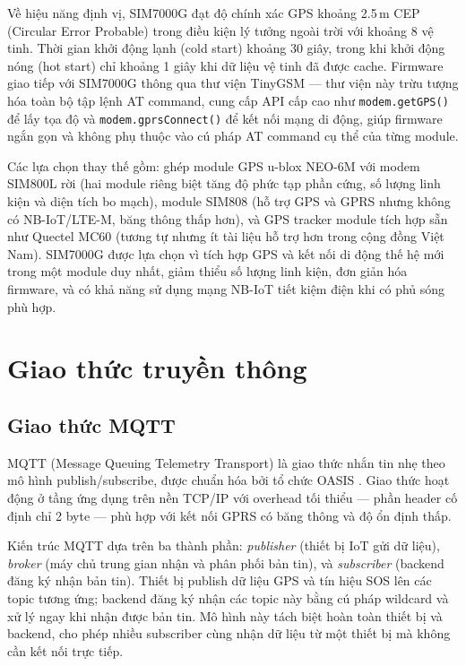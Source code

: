 \documentclass[../DoAn.tex]{subfiles}
\begin{document}
Về hiệu năng định vị, SIM7000G đạt độ chính xác GPS khoảng 2.5\,m CEP (Circular Error Probable) trong điều kiện lý tưởng ngoài trời với khoảng 8 vệ tinh. Thời gian khởi động lạnh (cold start) khoảng 30 giây, trong khi khởi động nóng (hot start) chỉ khoảng 1 giây khi dữ liệu vệ tinh đã được cache. Firmware giao tiếp với SIM7000G thông qua thư viện TinyGSM — thư viện này trừu tượng hóa toàn bộ tập lệnh AT command, cung cấp API cấp cao như \texttt{modem.getGPS()} để lấy tọa độ và \texttt{modem.gprsConnect()} để kết nối mạng di động, giúp firmware ngắn gọn và không phụ thuộc vào cú pháp AT command cụ thể của từng module.

Các lựa chọn thay thế gồm: ghép module GPS u-blox NEO-6M với modem SIM800L rời (hai module riêng biệt tăng độ phức tạp phần cứng, số lượng linh kiện và diện tích bo mạch), module SIM808 (hỗ trợ GPS và GPRS nhưng không có NB-IoT/LTE-M, băng thông thấp hơn), và GPS tracker module tích hợp sẵn như Quectel MC60 (tương tự nhưng ít tài liệu hỗ trợ hơn trong cộng đồng Việt Nam). SIM7000G được lựa chọn vì tích hợp GPS và kết nối di động thế hệ mới trong một module duy nhất, giảm thiểu số lượng linh kiện, đơn giản hóa firmware, và có khả năng sử dụng mạng NB-IoT tiết kiệm điện khi có phủ sóng phù hợp.

\section{Giao thức truyền thông}
\label{section:3.2}

\subsection{Giao thức MQTT}
\label{subsection:3.2.1}

MQTT (Message Queuing Telemetry Transport) là giao thức nhắn tin nhẹ theo mô hình publish/subscribe, được chuẩn hóa bởi tổ chức OASIS \cite{mqtt_standard}. Giao thức hoạt động ở tầng ứng dụng trên nền TCP/IP với overhead tối thiểu — phần header cố định chỉ 2 byte — phù hợp với kết nối GPRS có băng thông và độ ổn định thấp.

Kiến trúc MQTT dựa trên ba thành phần: \textit{publisher} (thiết bị IoT gửi dữ liệu), \textit{broker} (máy chủ trung gian nhận và phân phối bản tin), và \textit{subscriber} (backend đăng ký nhận bản tin). Thiết bị publish dữ liệu GPS và tín hiệu SOS lên các topic tương ứng; backend đăng ký nhận các topic này bằng cú pháp wildcard và xử lý ngay khi nhận được bản tin. Mô hình này tách biệt hoàn toàn thiết bị và backend, cho phép nhiều subscriber cùng nhận dữ liệu từ một thiết bị mà không cần kết nối trực tiếp.
\end{document}
